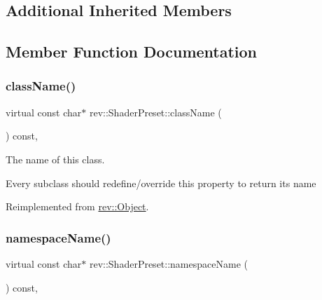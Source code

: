 \subsection*{Additional Inherited Members}


\subsection{Member Function Documentation}
\mbox{\label{classrev_1_1_shader_preset_a169c46262d1da9bfb67b26f2cf44e04e}} 
\subsubsection{\texorpdfstring{className()}{className()}}
{\footnotesize\ttfamily virtual const char$\ast$ rev\+::\+Shader\+Preset\+::class\+Name (\begin{DoxyParamCaption}{ }\end{DoxyParamCaption}) const\hspace{0.3cm}{\ttfamily [inline]}, {\ttfamily [virtual]}}



The name of this class. 

Every subclass should redefine/override this property to return its name 

Reimplemented from \mbox{\hyperlink{classrev_1_1_object_a7a2013f91169479b65cf93afdc5d9a68}{rev\+::\+Object}}.

\mbox{\label{classrev_1_1_shader_preset_acd4d41f0101552e7512714eb307e24a8}} 
\subsubsection{\texorpdfstring{namespaceName()}{namespaceName()}}
{\footnotesize\ttfamily virtual const char$\ast$ rev\+::\+Shader\+Preset\+::namespace\+Name (\begin{DoxyParamCaption}{ }\end{DoxyParamCaption}) const\hspace{0.3cm}{\ttfamily [inline]}, {\ttfamily [virtual]}}



